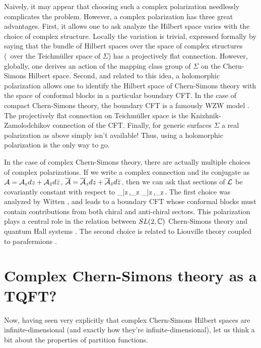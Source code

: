 \documentclass[12pt]{article}
\begin{document}
Naively, it may appear that choosing such a complex polarization needlessly complicates the problem. However, a complex polarization has three great advantages. First, it allows one to ask analyze the Hilbert space varies with the choice of complex structure. Locally the variation is trivial, expressed formally by saying that the bundle of Hilbert spaces over the space of complex structures (\DIie\ over the Teichm\"uller space of $\Sigma$) has a projectively flat connection. However, globally, one derives an action of the mapping class group of $\Sigma$ on the Chern-Simons Hilbert space. Second, and related to this idea, a holomorphic polarization allows one to identify the Hilbert space of Chern-Simons theory with the space of conformal blocks in a particular boundary CFT. In the case of compact Chern-Simons theory, the boundary CFT is a famously WZW model \cite{DIWit-Jones}. The projectively flat connection on Teichm\"uller space is the Knizhnik-Zamolodchikov connection of the CFT. Finally, for generic surfaces $\Sigma$ a real polarization as above simply isn't available! Thus, using a holomorphic polarization is the only way to go.

In the case of complex Chern-Simons theory, there are actually multiple choices of complex polarizations. If we write a complex connection and its conjugate as $\mathcal{A} = \mathcal{A}_z dz+\mathcal{A}_{\bar z}d\bar z$, $\overline {\mathcal{A}} = \overline{\mathcal{A}}_z dz+\overline{\mathcal{A}}_{\bar z}d\bar z$, then we can ask that sections of $\mathcal{L}$ be covariantly constant with respect to
%
\DIbe{} \quad  \CalA_{\bar z}\,,\quad \ol \CalA_{z} \qquad {}\qquad {} \;\;  \; \;  \ol\CalA_{\bar z}\,,\quad \ol \CalA_{z}\,.
\DIee
%
The first choice was analyzed by Witten \cite{DIWitten-cx}, and leads to a boundary CFT whose conformal blocks must contain contributions from both chiral and anti-chiral sectors. This polarization plays a central role in the relation between $SL(2,{\mathbb C})$ Chern-Simons theory and quantum Hall systems \cite{DIVafa-FQHE, DIDGV-FQHE}. The second choice is related to Liouville theory coupled to parafermions \cite{DINT-para, DICJ-AGT}.



\section{Complex Chern-Simons theory as a TQFT?}
\label{DI.sec:TQFT}

Now, having seen very explicitly that complex Chern-Simons Hilbert spaces are infinite-dimensional (and exactly how they're infinite-dimensional), let us think a bit about the properties of partition functions.
\end{document}

